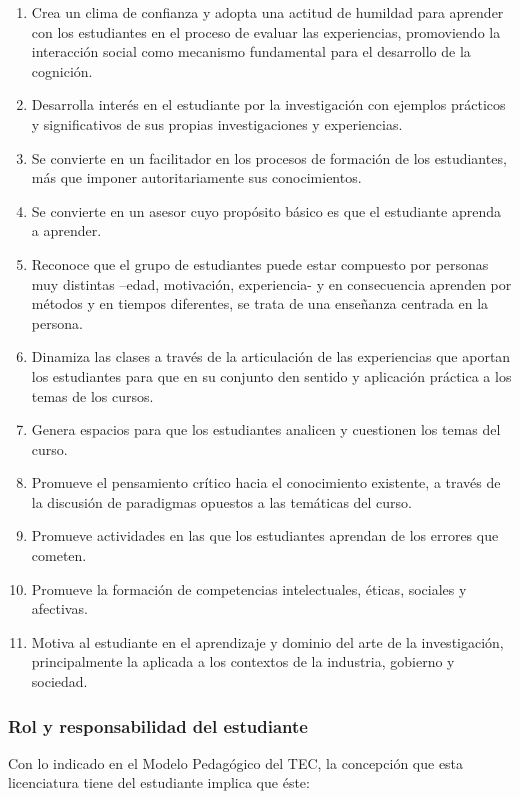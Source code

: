 \begin{enumerate}
\item Crea un clima de confianza y adopta una actitud de humildad para aprender con los estudiantes en el proceso de evaluar las experiencias, promoviendo la interacción social como mecanismo fundamental para el desarrollo de la cognición.
\item Desarrolla interés en el estudiante por la investigación con ejemplos prácticos y significativos de sus propias investigaciones y experiencias.
\item Se convierte en un facilitador en los procesos de formación de los estudiantes, más que imponer autoritariamente sus conocimientos.
\item Se convierte en un asesor cuyo propósito básico es que el estudiante aprenda a aprender.
\item Reconoce que el grupo de estudiantes puede estar compuesto por personas muy distintas –edad, motivación, experiencia- y en consecuencia aprenden por métodos y en tiempos diferentes, se trata de una enseñanza centrada en la persona.
\item Dinamiza las clases a través de la articulación de las experiencias que aportan los estudiantes para que en su conjunto den sentido y aplicación práctica a los temas de los cursos.
\item Genera espacios para que los estudiantes analicen y cuestionen los temas del curso.
\item Promueve el pensamiento crítico hacia el conocimiento existente, a través de la discusión de paradigmas opuestos a las temáticas del curso.
\item Promueve actividades en las que los estudiantes aprendan de los errores que cometen.
\item Promueve la formación de competencias intelectuales, éticas, sociales y afectivas.
\item Motiva al estudiante en el aprendizaje y dominio del arte de la investigación, principalmente la aplicada a los contextos de la industria, gobierno y sociedad.
\end{enumerate}
\subsubsection*{Rol y responsabilidad del estudiante}

Con lo indicado en el Modelo Pedagógico del TEC, la concepción que esta licenciatura tiene del estudiante implica que éste:\par

